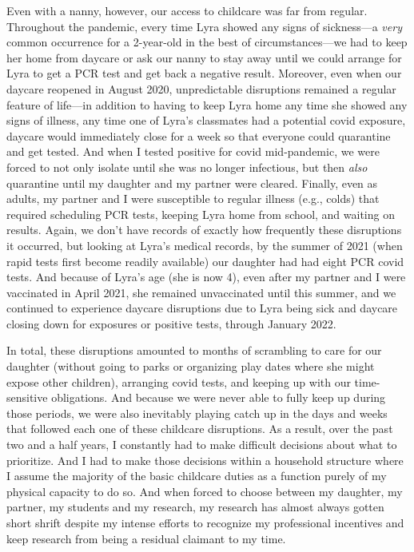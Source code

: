 \documentclass[11pt]{article}
\begin{document}
Even with a nanny, however, our access to childcare was far from regular. Throughout the pandemic, every time Lyra showed any signs of sickness---a \emph{very} common occurrence for a 2-year-old in the best of circumstances---we had to keep her home from daycare or ask our nanny to stay away until we could arrange for Lyra to get a PCR test and get back a negative result.   Moreover, even when our daycare reopened in August 2020, unpredictable disruptions remained a regular feature of life---in addition to having to keep Lyra home any time she showed any signs of illness, any time one of Lyra's classmates had a potential covid exposure, daycare would immediately close for a week so that everyone could quarantine and get tested. And when I tested positive for covid mid-pandemic, we were forced to not only isolate until she was no longer infectious, but then \emph{also} quarantine until my daughter and my partner were cleared.  Finally, even as adults, my partner and I were susceptible to regular illness (e.g., colds) that required scheduling PCR tests, keeping Lyra home from school, and waiting on results.  Again, we don't have records of exactly how frequently these disruptions it occurred, but looking at Lyra's medical records, by the summer of 2021 (when rapid tests first become readily available) our daughter had had eight PCR covid tests. And because of Lyra's age (she is now 4), even after my partner and I were vaccinated in April 2021, she remained unvaccinated until this summer, and we continued to experience daycare disruptions due to Lyra being sick and daycare closing down for exposures or positive tests, through January 2022.

In total, these disruptions amounted to months of scrambling to care for our daughter (without going to parks or organizing play dates where she might expose other children), arranging covid tests, and keeping up with our time-sensitive obligations. And because we were never able to fully keep up during those periods, we were also inevitably playing catch up in the days and weeks that followed each one of these childcare disruptions. As a result, over the past two and a half years, I constantly had to make difficult decisions about what to prioritize.  And I had to make those decisions within a household structure where I assume the majority of the basic childcare duties as a function purely of my physical capacity to do so.  And when forced to choose between my daughter, my partner, my students and my research, my research has almost always gotten short shrift despite my intense efforts to recognize my professional incentives and keep research from being a residual claimant to my time.
\end{document}
